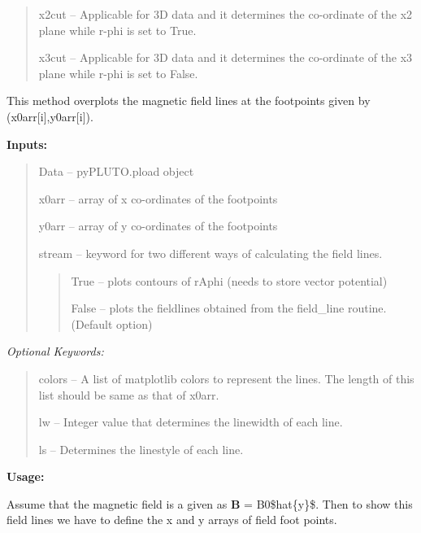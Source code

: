 \documentclass[letterpaper,10pt,english]{sphinxmanual}
\begin{document}
\begin{fulllineitems}
\begin{fulllineitems}
\begin{quote}
x2cut -- Applicable for 3D data and it determines the co-ordinate of the x2 plane while r-phi is set to True.

x3cut -- Applicable for 3D data and it determines the co-ordinate of the x3 plane while r-phi is set to False.
\end{quote}

\end{fulllineitems}


\begin{fulllineitems}
\label{image:pyPLUTO.Image.myfieldlines}
This method overplots the magnetic field lines at the footpoints given by (x0arr{[}i{]},y0arr{[}i{]}).

\textbf{Inputs:}
\begin{quote}

Data -- pyPLUTO.pload object

x0arr -- array of x co-ordinates of the footpoints

y0arr -- array of y co-ordinates of the footpoints

stream -- keyword for two different ways of calculating the field lines.
\begin{quote}

True -- plots contours of rAphi (needs to store vector potential)

False -- plots the fieldlines obtained from the field\_line routine. (Default option)
\end{quote}
\end{quote}

\emph{Optional Keywords:}
\begin{quote}

colors -- A list of matplotlib colors to represent the lines. The length of this list should be same as that of x0arr.

lw -- Integer value that determines the linewidth of each line.

ls -- Determines the linestyle of each line.
\end{quote}

\textbf{Usage:}

Assume that the magnetic field is a given as \textbf{B} = B0\$hat\{y\}\$. Then to show this field lines we have to define the x and y arrays of field foot points.



\end{fulllineitems}
\end{fulllineitems}
\end{document}
